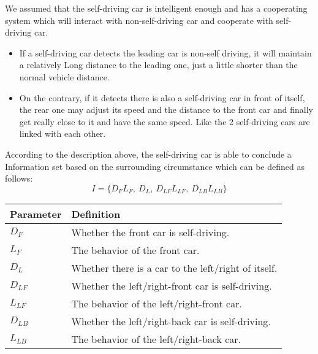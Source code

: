 \documentclass{mcmthesis}
\numberwithin{equation}{section}
\begin{document}
					We assumed that the self-driving car is intelligent enough and has a cooperating system which will interact with non-self-driving car and cooperate with self-driving car.
					\begin{itemize}
						\item If a self-driving car detects the leading car is non-self driving, it will maintain a relatively Long distance to the leading one, just a little shorter than the normal vehicle distance. 
						\item On the contrary, if it detects there is also a self-driving car in front of itself,  the rear one may adjust its speed and the distance to the front car and finally get really close to it and have the same speed. Like the 2 self-driving cars are linked with each other. 
					\end{itemize}
					According to the description above, the self-driving car is able to conclude a Information set based on the surrounding circumstance which can be defined as follows:
					\begin{equation}
						I = \{ D_{F}L_{F} ,\ D_{L} ,\ D_{LF}L_{LF} ,\ D_{LB}L_{LB} \}
					\end{equation}
					\begin{table}[H]
						\caption{Definitions to the parameters in the Information set}
						\begin{center}
							\begin{longtable}{m{80pt}<{\centering} | m{240pt}}
								\hline%
								Parameter 	& 	Definition 												\\
								\hline%
								$D_{F}$ 	&	Whether the front car is self-driving.					\\
								\hline%
								$L_{F}$		&	The behavior of the front car.							\\
								\hline%
								$D_{L}$		&	Whether there is a car to the left/right of itself.		\\
								\hline%
								$D_{LF}$	&	Whether the left/right-front car is self-driving.		\\
								\hline%
								$L_{LF}$	&	The behavior of the left/right-front car.				\\
								\hline%
								$D_{LB}$	&	Whether the left/right-back car is self-driving.		\\
								\hline%
								$L_{LB}$	&	The behavior of the left/right-back car.				\\
								\hline%
							\end{longtable}
						\end{center}
					\end{table}
\end{document}
